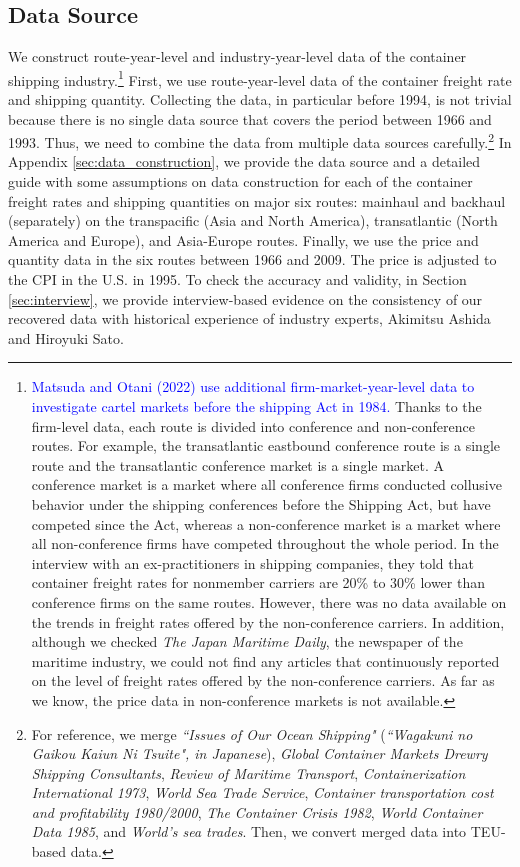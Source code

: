 \documentclass[11pt]{article}
\begin{document}
\subsection{Data Source}\label{subsec:data}
We construct route-year-level and industry-year-level data of the container shipping industry.\footnote{\textcolor{blue}{Matsuda and Otani (2022) use additional firm-market-year-level data to investigate cartel markets before the shipping Act in 1984.} Thanks to the firm-level data, each route is divided into conference and non-conference routes. For example, the transatlantic eastbound conference route is a single route and the transatlantic conference market is a single market. A conference market is a market where all conference firms conducted collusive behavior under the shipping conferences before the Shipping Act, but have competed since the Act, whereas a non-conference market is a market where all non-conference firms have competed throughout the whole period. In the interview with an ex-practitioners in shipping companies, they told that container freight rates for nonmember carriers are 20\% to 30\% lower than conference firms on the same routes. However, there was no data available on the trends in freight rates offered by the non-conference carriers. In addition, although we checked \textit{The Japan Maritime Daily}, the newspaper of the maritime industry, we could not find any articles that continuously reported on the level of freight rates offered by the non-conference carriers. As far as we know, the price data in non-conference markets is not available.} First, we use route-year-level data of the container freight rate and shipping quantity. Collecting the data, in particular before 1994, is not trivial because there is no single data source that covers the period between 1966 and 1993. Thus, we need to combine the data from multiple data sources carefully.\footnote{For reference, we merge \textit{``Issues of Our Ocean Shipping"} (\textit{``Wagakuni no Gaikou Kaiun Ni Tsuite", in Japanese}), \textit{Global Container Markets Drewry Shipping Consultants}, \textit{Review of Maritime Transport}, \textit{Containerization International 1973}, \textit{World Sea Trade Service}, \textit{Container transportation cost and profitability 1980/2000}, \textit{The Container Crisis 1982}, \textit{World Container Data 1985}, and \textit{World's sea trades}. Then, we convert merged data into TEU-based data.} In Appendix \ref{sec:data_construction}, we provide the data source and a detailed guide with some assumptions on data construction for each of the container freight rates and shipping quantities on major six routes: mainhaul and backhaul (separately) on the transpacific (Asia and North America), transatlantic (North America and Europe), and Asia-Europe routes. Finally, we use the price and quantity data in the six routes between 1966 and 2009. The price is adjusted to the CPI in the U.S. in 1995. To check the accuracy and validity, in Section \ref{sec:interview}, we provide interview-based evidence on the consistency of our recovered data with historical experience of industry experts, Akimitsu Ashida and Hiroyuki Sato.
\end{document}
